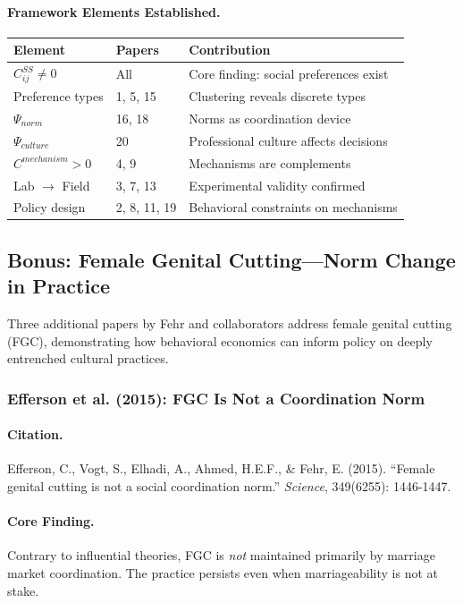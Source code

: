 \paragraph{Framework Elements Established.}

\begin{center}
\renewcommand{\arraystretch}{1.2}
\small
\begin{tabular}{lll}
\hline
\textbf{Element} & \textbf{Papers} & \textbf{Contribution} \\
\hline
$C^{SS}_{ij} \neq 0$ & All & Core finding: social preferences exist \\
Preference types & 1, 5, 15 & Clustering reveals discrete types \\
$\Psi_{norm}$ & 16, 18 & Norms as coordination device \\
$\Psi_{culture}$ & 20 & Professional culture affects decisions \\
$C^{mechanism} > 0$ & 4, 9 & Mechanisms are complements \\
Lab $\to$ Field & 3, 7, 13 & Experimental validity confirmed \\
Policy design & 2, 8, 11, 19 & Behavioral constraints on mechanisms \\
\hline
\end{tabular}
\end{center}

\subsection{Bonus: Female Genital Cutting---Norm Change in Practice}

Three additional papers by Fehr and collaborators address female genital
cutting (FGC), demonstrating how behavioral economics can inform policy
on deeply entrenched cultural practices.

\subsubsection{Efferson et al. (2015): FGC Is Not a Coordination Norm}

\paragraph{Citation.}
Efferson, C., Vogt, S., Elhadi, A., Ahmed, H.E.F., \& Fehr, E. (2015).
``Female genital cutting is not a social coordination norm.''
\emph{Science}, 349(6255): 1446-1447.

\paragraph{Core Finding.}
Contrary to influential theories, FGC is \emph{not} maintained primarily
by marriage market coordination. The practice persists even when
marriageability is not at stake.

